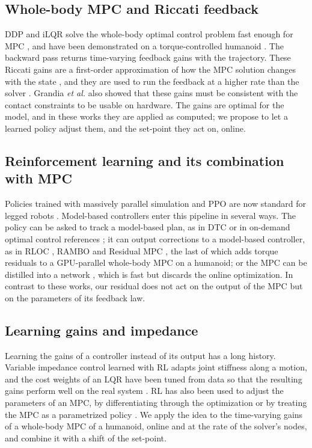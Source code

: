\documentclass[conference]{IEEEtran}
\begin{document}
\subsection{Whole-body MPC and Riccati feedback}
DDP \cite{mayne1966ddp} and iLQR \cite{li2004ilqr} solve the whole-body optimal control problem fast enough for MPC \cite{tassa2012synthesis,mastalli2020crocoddyl}, and have been demonstrated on a torque-controlled humanoid \cite{dantec2022wbmpc}.
The backward pass returns time-varying feedback gains with the trajectory.
These Riccati gains are a first-order approximation of how the MPC solution changes with the state \cite{dantec2022firstorder}, and they are used to run the feedback at a higher rate than the solver \cite{grandia2019feedback,dantec2022wbmpc}.
Grandia \emph{et al.} \cite{grandia2019feedback} also showed that these gains must be consistent with the contact constraints to be usable on hardware.
The gains are optimal for the model, and in these works they are applied as computed; we propose to let a learned policy adjust them, and the set-point they act on, online.

\subsection{Reinforcement learning and its combination with MPC}
Policies trained with massively parallel simulation \cite{rudin2022minutes} and PPO \cite{schulman2017ppo} are now standard for legged robots \cite{hwangbo2019learning,lee2020learning,radosavovic2024humanoid}.
Model-based controllers enter this pipeline in several ways.
The policy can be asked to track a model-based plan, as in DTC \cite{jenelten2024dtc} or in on-demand optimal control references \cite{kang2023rlmodel}; it can output corrections to a model-based controller, as in RLOC \cite{gangapurwala2022rloc}, RAMBO \cite{cheng2025rambo} and Residual MPC \cite{jeon2025residualmpc}, the last of which adds torque residuals to a GPU-parallel whole-body MPC on a humanoid; or the MPC can be distilled into a network \cite{carius2020mpcnet,reske2021imitation}, which is fast but discards the online optimization.
In contrast to these works, our residual does not act on the output of the MPC but on the parameters of its feedback law.

\subsection{Learning gains and impedance}
Learning the gains of a controller instead of its output has a long history.
Variable impedance control learned with RL \cite{buchli2011variable} adapts joint stiffness along a motion, and the cost weights of an LQR have been tuned from data so that the resulting gains perform well on the real system \cite{marco2016lqr}.
RL has also been used to adjust the parameters of an MPC, by differentiating through the optimization \cite{amos2018diffmpc,romero2024acmpc} or by treating the MPC as a parametrized policy \cite{gros2020nmpcrl}.
We apply the idea to the time-varying gains of a whole-body MPC of a humanoid, online and at the rate of the solver's nodes, and combine it with a shift of the set-point.
\end{document}
